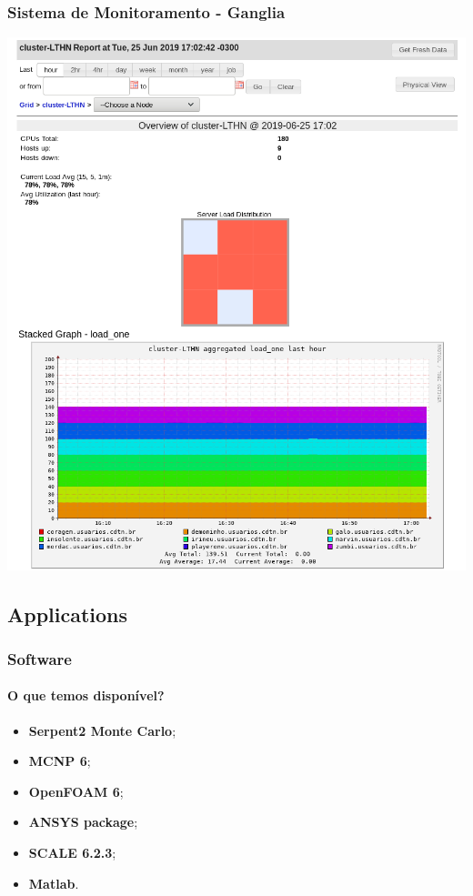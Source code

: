 \documentclass[svgnames,smaller,table]{beamer}
\begin{document}
\begin{frame}
  \frametitle{Sistema de Monitoramento - Ganglia}
  \centering\includegraphics[scale=0.3]{images/ganglia_colors.png}
 
\end{frame}


\subsection{Applications}
\begin{frame}
  \frametitle{Software}
  \framesubtitle{O que temos disponível?}
  \begin{itemize}
  \item \textbf{Serpent2 Monte Carlo};
  \item \textbf{MCNP 6};
  \item \textbf{OpenFOAM 6};
  \item \textbf{ANSYS package};
  \item \textbf{SCALE 6.2.3};
  \item \textbf{Matlab}.
  \end{itemize}
\end{frame}
\end{document}
